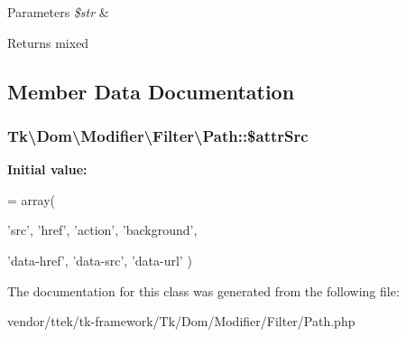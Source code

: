\begin{DoxyParams}{Parameters}
{\em \$str} & \\
\hline
\end{DoxyParams}
\begin{DoxyReturn}{Returns}
mixed 
\end{DoxyReturn}


\subsection{Member Data Documentation}
\hypertarget{classTk_1_1Dom_1_1Modifier_1_1Filter_1_1Path_a851406eb14f38205820eb3f949028a35}{
\subsubsection[{\$attr\+Src}]{\setlength{\rightskip}{0pt plus 5cm}Tk\textbackslash{}\+Dom\textbackslash{}\+Modifier\textbackslash{}\+Filter\textbackslash{}\+Path\+::\$attr\+Src\hspace{0.3cm}{\ttfamily [protected]}}}\label{classTk_1_1Dom_1_1Modifier_1_1Filter_1_1Path_a851406eb14f38205820eb3f949028a35}
{\bfseries Initial value\+:}
\begin{DoxyCode}
= array(
        
        \textcolor{stringliteral}{'src'}, \textcolor{stringliteral}{'href'}, \textcolor{stringliteral}{'action'}, \textcolor{stringliteral}{'background'},
        
        \textcolor{stringliteral}{'data-href'}, \textcolor{stringliteral}{'data-src'}, \textcolor{stringliteral}{'data-url'}
    )
\end{DoxyCode}


The documentation for this class was generated from the following file\+:\begin{DoxyCompactItemize}
\item 
vendor/ttek/tk-\/framework/\+Tk/\+Dom/\+Modifier/\+Filter/Path.\+php\end{DoxyCompactItemize}
